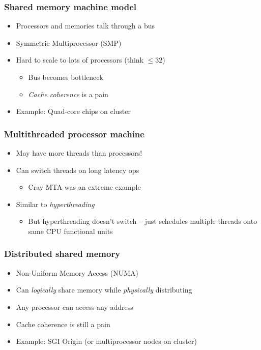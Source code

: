 \documentclass{beamer}
\begin{document}
\begin{frame}
  \frametitle{Shared memory machine model}

  \begin{itemize}
  \item Processors and memories talk through a bus
  \item Symmetric Multiprocessor (SMP)
  \item Hard to scale to lots of processors (think $\leq 32$)
    \begin{itemize}
      \item Bus becomes bottleneck
      \item {\em Cache coherence} is a pain
    \end{itemize}
  \item Example: Quad-core chips on cluster
  \end{itemize}
\end{frame}


\begin{frame}
  \frametitle{Multithreaded processor machine}
  
  \begin{itemize}
  \item May have more threads than processors!
  \item Can switch threads on long latency ops
    \begin{itemize}
    \item Cray MTA was an extreme example
    \end{itemize}
  \item Similar to {\em hyperthreading}
    \begin{itemize}
    \item But hyperthreading doesn't switch -- just schedules multiple
      threads onto same CPU functional units
    \end{itemize}
  \end{itemize}
\end{frame}


\begin{frame}
  \frametitle{Distributed shared memory}
 
  \begin{itemize}
  \item Non-Uniform Memory Access (NUMA)
  \item Can {\em logically} share memory while {\em physically} distributing
  \item Any processor can access any address
  \item Cache coherence is still a pain
  \item Example: SGI Origin (or multiprocessor nodes on cluster)
  \end{itemize}
\end{frame}
\end{document}

